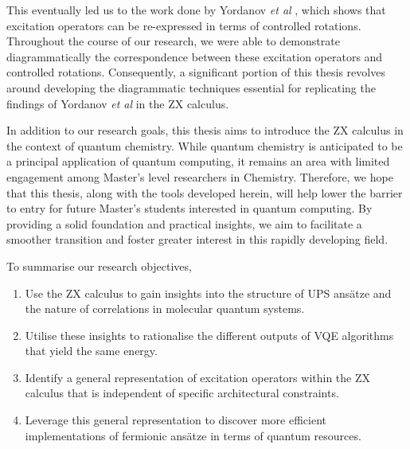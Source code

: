 This eventually led us to the work done by Yordanov \textit{et al} \cite{Yordanov2020}, which shows that excitation operators can be re-expressed in terms of controlled rotations. Throughout the course of our research, we were able to demonstrate diagrammatically the correspondence between these excitation operators and controlled rotations. Consequently, a significant portion of this thesis revolves around developing the diagrammatic techniques essential for replicating the findings of Yordanov \textit{et al} in the ZX calculus.

In addition to our research goals, this thesis aims to introduce the ZX calculus in the context of quantum chemistry. While quantum chemistry is anticipated to be a principal application of quantum computing, it remains an area with limited engagement among Master's level researchers in Chemistry. Therefore, we hope that this thesis, along with the tools developed herein, will help lower the barrier to entry for future Master's students interested in quantum computing. By providing a solid foundation and practical insights, we aim to facilitate a smoother transition and foster greater interest in this rapidly developing field.

To summarise our research objectives,
\begin{enumerate}[itemsep=-5pt]
\item Use the ZX calculus to gain insights into the structure of UPS ansätze and the nature of correlations in molecular quantum systems.
\item Utilise these insights to rationalise the different outputs of VQE algorithms that yield the same energy.
\item Identify a general representation of excitation operators within the ZX calculus that is independent of specific architectural constraints.
\item Leverage this general representation to discover more efficient implementations of fermionic ansätze in terms of quantum resources.
\end{enumerate}
